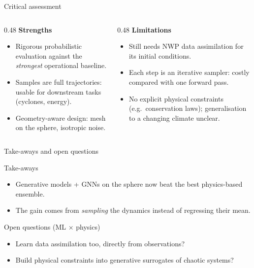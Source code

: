 \documentclass[aspectratio=169,11pt]{beamer}
\begin{document}
\begin{frame}{Critical assessment}
  \begin{columns}[T]
    \begin{column}{0.48\textwidth}
      \textbf{Strengths}
      \begin{itemize}
        \item Rigorous probabilistic evaluation against the \emph{strongest} operational baseline.
        \item Samples are full trajectories: usable for downstream tasks (cyclones, energy).
        \item Geometry-aware design: mesh on the sphere, isotropic noise.
      \end{itemize}
    \end{column}
    \begin{column}{0.48\textwidth}
      \textbf{Limitations}
      \begin{itemize}
        \item Still needs NWP \alert{data assimilation} for its initial conditions.
        \item Each step is an iterative sampler: \alert{costly} compared with one forward pass.
        \item No explicit physical constraints (e.g.\ conservation laws); generalisation to a \alert{changing climate} unclear.
      \end{itemize}
    \end{column}
  \end{columns}
\end{frame}

\begin{frame}{Take-aways and open questions}
  \begin{block}{Take-aways}
    \begin{itemize}
      \item Generative models + GNNs on the sphere now beat the best physics-based ensemble.
      \item The gain comes from \emph{sampling} the dynamics instead of regressing their mean.
    \end{itemize}
  \end{block}
  \begin{block}{Open questions (ML $\times$ physics)}
    \begin{itemize}
      \item Learn data assimilation too, directly from observations?
      \item Build physical constraints into generative surrogates of chaotic systems?
    \end{itemize}
  \end{block}
  \vfill
\end{frame}
\end{document}
